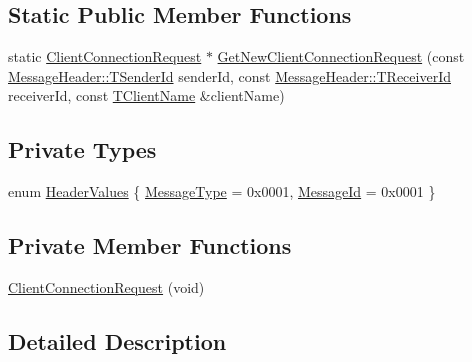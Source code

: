 \subsection*{Static Public Member Functions}
\begin{DoxyCompactItemize}
\item 
static \hyperlink{class_terra_swarm_1_1_asynchronous_1_1_client_connection_request}{Client\-Connection\-Request} $\ast$ \hyperlink{class_terra_swarm_1_1_asynchronous_1_1_client_connection_request_a7325e82c2e6f7f1bb538c287d55ae863}{Get\-New\-Client\-Connection\-Request} (const \hyperlink{class_terra_swarm_1_1_message_header_a516b36855e2aad7cfbf8770f1b42784f}{Message\-Header\-::\-T\-Sender\-Id} sender\-Id, const \hyperlink{class_terra_swarm_1_1_message_header_aa3260702b182b6f88ddbdd3416e98df0}{Message\-Header\-::\-T\-Receiver\-Id} receiver\-Id, const \hyperlink{class_terra_swarm_1_1_asynchronous_1_1_client_connection_request_a50a16fcfef8eb10d5191b6eaf0723a92}{T\-Client\-Name} \&client\-Name)
\end{DoxyCompactItemize}
\subsection*{Private Types}
\begin{DoxyCompactItemize}
\item 
enum \hyperlink{class_terra_swarm_1_1_asynchronous_1_1_client_connection_request_a5b974b64f68c96feb31f851ddb46c0f9}{Header\-Values} \{ \hyperlink{class_terra_swarm_1_1_asynchronous_1_1_client_connection_request_a5b974b64f68c96feb31f851ddb46c0f9af4ebdf9aec34ae059a020f367ea2b77d}{Message\-Type} = 0x0001, 
\hyperlink{class_terra_swarm_1_1_asynchronous_1_1_client_connection_request_a5b974b64f68c96feb31f851ddb46c0f9afc748027046d48c60438e276e3f820a6}{Message\-Id} = 0x0001
 \}
\end{DoxyCompactItemize}
\subsection*{Private Member Functions}
\begin{DoxyCompactItemize}
\item 
\hyperlink{class_terra_swarm_1_1_asynchronous_1_1_client_connection_request_a4e8af695cc4e00a3da450f81fa2bc108}{Client\-Connection\-Request} (void)
\end{DoxyCompactItemize}


\subsection{Detailed Description}


